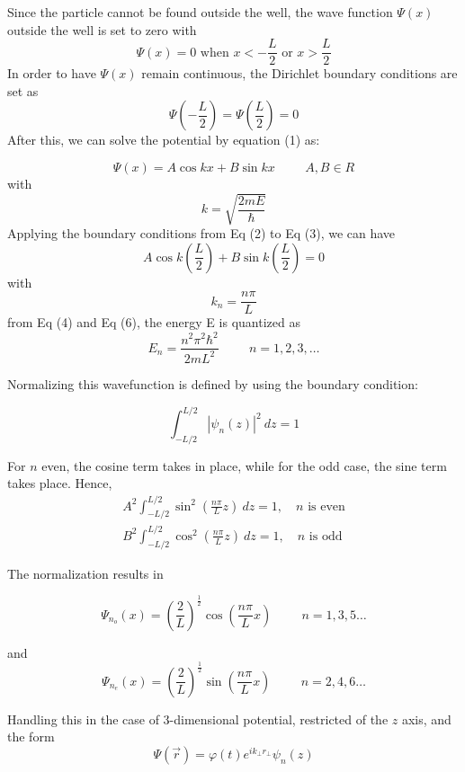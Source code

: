 	Since the particle cannot be found outside the well, the wave function $\Psi(x)$ outside the well is set to zero with$$\Psi(x) =0 \text{ when }x < -\frac{L}{2} \text{ or } x > \frac{L}{2} $$
	In order to have $\Psi(x)$ remain continuous, the Dirichlet boundary conditions are set as$$\Psi\left( -\frac{L}{2} \right)=\Psi \left( \frac{L}{2} \right) = 0 $$
	After this, we can solve the potential by equation (1) as:

  \begin{equation}
    \Psi(x) = A\cos kx + B\sin kx \hspace{1cm}A,B \in R 
  \end{equation}
	with $$k = \sqrt{ \frac{2mE}{\hbar} } $$
	Applying the boundary conditions from Eq (2) to Eq (3), we can have $$A\cos k\left( \frac{L}{2} \right) + B \sin k \left( \frac{L}{2} \right) = 0 $$
	with $$k_{n} = \frac{n\pi}{L} $$
	from Eq (4) and Eq (6), the energy E is quantized as$$E_{n}=\frac{n^2\pi^2\hbar^{2}}{2mL^{2}}\hspace{1cm}n=1,2,3,\ldots$$

Normalizing this wavefunction is defined by using the boundary condition: 

\begin{equation}
    \int_{-L/2}^{L/2} | \psi_n (z) |^2 \: dz = 1
\end{equation}

For $n$ even, the cosine term takes in place, while for the odd case, the sine term takes place. Hence, 
\begin{align}
    A^{2} \int_{-L/2}^{L/2} \sin^{2}{\left(\frac{n\pi}{L} z\right)} \: dz = 1, \quad n\text{ is even} \\
    B^{2} \int_{-L/2}^{L/2} \cos^{2}{\left(\frac{n\pi}{L} z\right)} \: dz = 1, \quad n\text{ is odd}
\end{align}

The normalization results in 

$$\Psi_{n_{o}}(x)=\left( \frac{2}{L} \right)^{\frac{1}{2}}\cos\left( \frac{n\pi}{L}x \right) \hspace{1cm}n =1,3,5 \ldots$$

and$$\Psi_{n_{e}}(x)= \left( \frac{2}{L} \right)^{\frac{1}{2}}\sin\left( \frac{n\pi}{L}x \right) \hspace{1cm} n = 2,4,6 \ldots$$

Handling this in the case of 3-dimensional potential, restricted of the $z$ axis, and the form 
\begin{equation}
    \Psi(\vec{r}) = \varphi(t) e^{i k_{\perp} r_{\perp}} \psi_n(z)
\end{equation}

